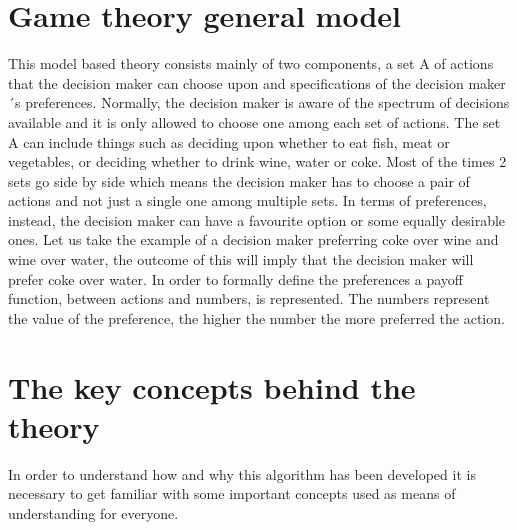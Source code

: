 \documentclass[conference]{IEEEtran}
\begin{document}
\section{Game theory general model}
This model based theory consists mainly of two components, a set A of actions that the decision maker can choose upon and specifications of the decision maker´s preferences. Normally, the decision maker is aware of the spectrum of decisions available and it is only allowed to choose one among each set of actions. The set A can include things such as deciding upon whether to eat fish, meat or vegetables, or deciding whether to drink wine, water or coke. Most of the times 2 sets go side by side which means the decision maker has to choose a pair of actions and not just a single one among multiple sets. In terms of preferences, instead, the decision maker can have a favourite option or some equally desirable ones. Let us take the example of a decision maker preferring coke over wine and wine over water, the outcome of this will imply that the decision maker will prefer coke over water. In order to formally define the preferences a payoff function, between actions and numbers, is represented. The numbers represent the value of the preference, the higher the number the more preferred the action\cite{b2}.

\section{The key concepts behind the theory}
In order to understand how and why this algorithm has been developed it is necessary to get familiar with some important concepts used as means of understanding for everyone.
\end{document}
